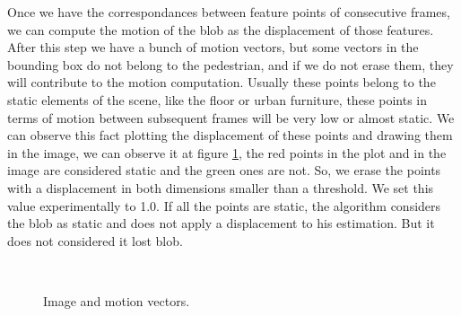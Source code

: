 
Once we have the correspondances between feature points of consecutive frames, we can compute the motion of the blob as the displacement of those features. After this step we have a bunch of motion vectors, but some vectors in the bounding box do not belong to the pedestrian, and if we do not erase them, they will contribute to the motion computation. Usually these points belong to the static elements of the scene, like the floor or urban furniture, these points in terms of motion between subsequent frames will be very low or almost static. We can observe this fact plotting the displacement of these points and drawing them in the image, we can observe it at figure \ref{motion2}, the red points in the plot and in the image are considered static and the green ones are not. So, we erase the points with a displacement in both dimensions smaller than a threshold. We set this value experimentally to 1.0. If all the points are static, the algorithm considers the blob as static and does not apply a displacement to his estimation. But it does not considered it lost blob. 


\begin{figure}[H]
		
\centering

\\
\caption{Image and motion vectors.}
\label{motion2}
\end{figure}

